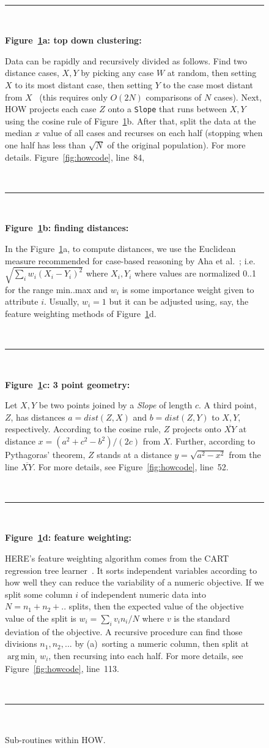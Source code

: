 \documentclass[conference]{IEEEtran}
\newcommand{\fig}[1]{Figure~\ref{fig:#1}}
\DeclareMathOperator*{\argmin}{arg\,min}
\begin{document}
\begin{figure}[b!]
\small
~\hrule~

{\bf \fig{where}a: top down clustering:}

Data can be rapidly and recursively divided   as follows.
Find   two   distance cases,  $X,Y$
by picking any case $W$ at random, then setting $X$ to its most
distant case, then setting $Y$ to the case most distant from
$X$~\cite{fastmap}
(this requires only $O(2N)$ comparisons
of $N$ cases).
Next, HOW projects each case $Z$
onto a {\tt Slope} that  runs between $X,Y$ using the cosine
rule of \fig{where}b. After that,  split the data at the median $x$ value of all cases and
recurses on each half  (stopping when
one half has less  than $\sqrt{N}$ of the original population). For more details. \fig{howcode}, line~84, 

~\hrule~
 
{\bf \fig{where}b: finding distances:}

In the \fig{where}a, to compute distances, we use
the Euclidean measure recommended for
case-based reasoning by Aha et al.~\cite{aha91};
i.e. $\sqrt{\sum_iw_i(X_i-Y_i)^2}$ where $X_i,Y_i$
where values are  normalized 0..1 for the range min..max and 
$w_i$ is some importance weight given to attribute $i$.
Usually, $w_i=1$ but it can be adjusted using, say,
the feature weighting methods of \fig{where}d. 
 
 ~\hrule~
 
{\bf \fig{where}c: 3 point geometry:}
 
Let   $X,Y$ be two points joined by  a {\em Slope} of  length $c$.
A third point, $Z$, has distances  $a=dist(Z,X)$ and
$b=dist(Z,Y)$ to $X,Y$, respectively.
According to the cosine rule,   $Z$ projects onto  $\overline{XY}$
at distance $x=(a^2 + c^2 - b^2)/(2c)$ from $X$.
Further, according to Pythagoras' theorem, $Z$ stands at a distance
$y = \sqrt{a^2 - x^2}$ from the line $\overline{XY}$. For more details, see  \fig{howcode}, line~52.

~\hrule~

{\bf \fig{where}d: feature weighting:}

HERE's feature weighting algorithm
comes from the CART regression tree learner~\cite{Breiman1984}.
It sorts independent variables
 according to how well they can reduce the variability
of a  numeric objective.
If we split some column $i$ of independent numeric data  into $N=n_1 + n_2 + ..$ splits,
then the expected
value of the objective value of the split  is $w_i = \sum_i v_in_i/N$
where $v$ is the standard deviation of the objective.
A recursive procedure can  find those divisions $n_1,n_2,...$ by (a)~sorting a numeric column,
then split at $\argmin_i w_i$, then recursing into each half.  For more details, see  \fig{howcode}, line~113.

~\hrule~
 
\caption{Sub-routines within HOW.}\label{fig:where}
\end{figure}
\end{document}
